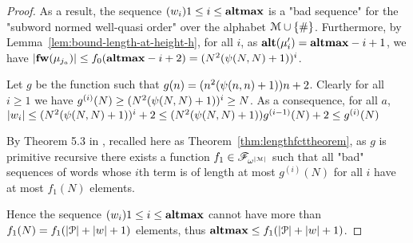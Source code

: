 \begin{proof}
	As a result, the sequence $(w_i){1\leq i \leq \mathbf{altmax}}$ is a "bad sequence" for the "subword normed well-quasi order" over the alphabet $\mathcal{M}\cup\{\#\}$.
	Furthermore, by Lemma~\ref{lem:bound-length-at-height-h}, for all $i$, as $\mathbf{alt}(\mu'_{i}) = \mathbf{altmax}-i+1$, we have $|\mathbf{fw}(\mu_{j_a})| \leq f_0(\mathbf{altmax}-i+2) = (N^2(\psi(N,N)+1))^{i}$.
	
	Let $g$ be the function such that $g(n) = (n^2(\psi(n,n)+1))n+2$. Clearly for all $i\geq 1$ we have $g^{(i)}(N) \geq (N^2(\psi(N,N)+1))^{i} \geq N$.
	As a consequence, for all $a$, $|w_i| \leq (N^2(\psi(N,N)+1))^{i} + 2 \leq (N^2(\psi(N,N)+1)) g^{(i-1)}(N) + 2 \leq g^{(i)}(N)$
	
	By Theorem 5.3 in \cite{SchmitzS2011upperHigman}, recalled here as Theorem~\ref{thm:lengthfcttheorem}, as $g$ is primitive recursive there exists a function $f_1 \in \mathscr{F}_{\omega^{|\mathcal{M}|}}$ such that all "bad" sequences of words whose $i$th term is of length at most $g^{(i)}(N)$ for all $i$ have at most $f_1(N)$ elements.
	
	Hence the sequence $(w_i){1\leq i \leq \mathbf{altmax}}$ cannot have more than $f_1(N) = f_1(|\mathcal{P}| + |w| + 1)$ elements, thus $\mathbf{altmax} \leq f_1(|\mathcal{P}| + |w| + 1)$.
\end{proof}

\lemBoundMinHeight*

